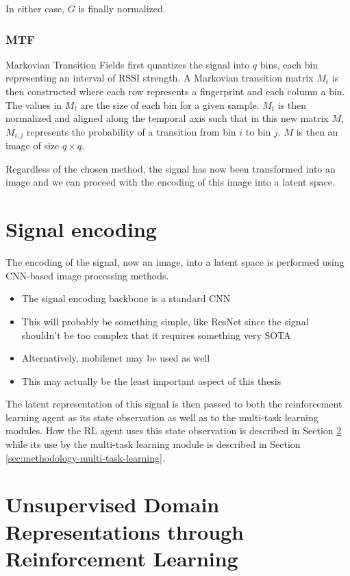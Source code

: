 In either case, $G$ is finally normalized.

\subsubsection{MTF}

Markovian Transition Fields \cite{wang2015imaging} first quantizes the signal into $q$ bins, each bin representing an interval of RSSI strength.
A Markovian transition matrix $M_{t}$ is then constructed where each row represents a fingerprint and each column a bin. 
The values in $M_{t}$ are the size of each bin for a given sample.
$M_{t}$ is then normalized and aligned along the temporal axis such that in this new matrix $M$, $M_{i, j}$ represents the probability of a transition from bin $i$ to bin $j$.
$M$ is then an image of size $q \times q$.

Regardless of the chosen method, the signal has now been transformed into an image and we can proceed with the encoding of this image into a latent space.

\section{Signal encoding}\label{sec:methodology-signal-encoding}

The encoding of the signal, now an image, into a latent space is performed using CNN-based image processing methods.

\begin{itemize}
	\item The signal encoding backbone is a standard CNN
	\item This will probably be something simple, like ResNet since the signal shouldn't be too complex that it requires something very SOTA
	\item Alternatively, mobilenet may be used as well
	\item This may actually be the least important aspect of this thesis
\end{itemize}

The latent representation of this signal is then passed to both the reinforcement learning agent as its state observation as well as to the multi-task learning modules.
How the RL agent uses this state observation is described in Section \ref{sec:methodology-rl} while its use by the multi-task learning module is described in Section \ref{sec:methodology-multi-task-learning}.

\section{Unsupervised Domain Representations through Reinforcement Learning}\label{sec:methodology-rl}

